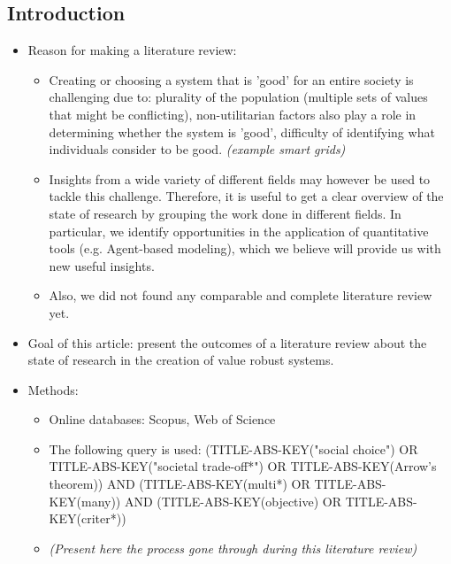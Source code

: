 \documentclass[a4paper,10pt]{article}
\begin{document}
\vspace{0.8 cm}
\begin{multicols}{2}
\section{Introduction}
\label{Introduction}

\begin{itemize}
	\setlength\itemsep{-0.1em}
	\item Reason for making a literature review: 
	\begin{itemize}
		\setlength\itemsep{-0.1em}
		\item Creating or choosing a system that is 'good' for an entire society is challenging due to: plurality of the population (multiple sets of values that might be conflicting), non-utilitarian factors also play a role in determining whether the system is 'good', difficulty of identifying what individuals consider to be good. {\itshape(example smart grids)}
		\item Insights from a wide variety of different fields may however be used to tackle this challenge. Therefore, it is useful to get a clear overview of the state of research by grouping the work done in different fields. In particular, we identify opportunities in the application of quantitative tools (e.g. Agent-based modeling), which we believe will provide us with new useful insights.
		\item Also, we did not found any comparable and complete literature review yet.
	\end{itemize}
	\item Goal of this article: present the outcomes of a literature review about the state of research in the creation of value robust systems.
	\item Methods:
	\begin{itemize}
		\setlength\itemsep{-0.1em}
		\item Online databases: Scopus, Web of Science
		\item The following query is used: (TITLE-ABS-KEY("social choice") OR TITLE-ABS-KEY("societal trade-off*") OR TITLE-ABS-KEY(Arrow's theorem)) AND (TITLE-ABS-KEY(multi*) OR TITLE-ABS-KEY(many)) AND (TITLE-ABS-KEY(objective) OR TITLE-ABS-KEY(criter*))
		\item {\itshape(Present here the process gone through during this literature review)}
	\end{itemize}
\end{itemize}


\end{multicols}
\end{document}
